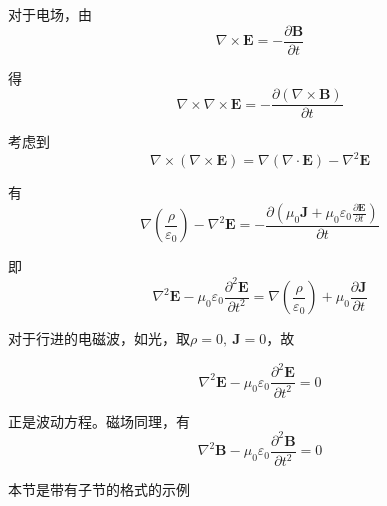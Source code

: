 \documentclass{template}
\begin{document}
\begin{solution}
    对于电场，由
    \begin{equation}
        \nabla\times\mathbf{E}=-\frac{\partial\mathbf{B}}{\partial t}
    \end{equation}
    
    得
    \begin{equation}
        \nabla\times\nabla\times\mathbf{E}=-\frac{\partial(\nabla\times\mathbf{B})}{\partial t}
    \end{equation}

    考虑到
    \begin{equation}
        \nabla\times(\nabla\times\mathbf{E})=\nabla(\nabla\cdot\mathbf{E})-\nabla^2\mathbf{E}
    \end{equation}

    有
    \begin{equation}
        \nabla(\frac{\rho}{\varepsilon_0})-\nabla^2\mathbf{E}=-\frac{\partial(\mu_0 \mathbf{J}+\mu_0\varepsilon_0\frac{\partial\mathbf{E}}{\partial t})}{\partial t}
    \end{equation}

    即
    \begin{equation}
        \nabla^2\mathbf{E}-\mu_0\varepsilon_0\frac{\partial^2\mathbf{E}}{\partial t^2}=\nabla(\frac{\rho}{\varepsilon_0})+\mu_0\frac{\partial\mathbf{J}}{\partial t}
    \end{equation}

    对于行进的电磁波，如光，取$\rho=0,\ \mathbf{J}=0$，故

    \begin{equation}
        \nabla^2\mathbf{E}-\mu_0\varepsilon_0\frac{\partial^2\mathbf{E}}{\partial t^2}=0
    \end{equation}

    正是波动方程。磁场同理，有
    \begin{equation}
        \nabla^2\mathbf{B}-\mu_0\varepsilon_0\frac{\partial^2\mathbf{B}}{\partial t^2}=0
    \end{equation}
\end{solution}
\begin{mdframed}
  \centering
    本节是带有子节的格式的示例
\end{mdframed}
\end{document}

